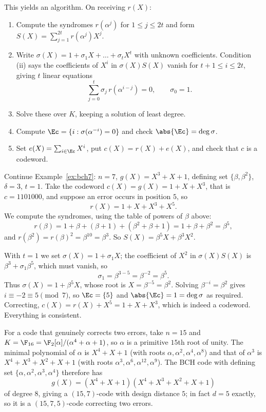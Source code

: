 This yields an algorithm. On receiving $r(X)$:
\begin{enumerate}[label=(\arabic*)]
	\item Compute the syndromes $r(\alpha^j)$ for $1 \le j \le 2t$ and form $S(X) = \sum_{j=1}^{2t}r(\alpha^j)X^j$.
	\item Write $\sigma(X) = 1 + \sigma_1X+\dots+\sigma_tX^t$ with unknown coefficients. Condition (ii) says the coefficients of $X^i$ in $\sigma(X)S(X)$ vanish for $t+1\le i\le 2t$, giving $t$ linear equations
	$$\sum_{j=0}^{t}\sigma_j\, r(\alpha^{i-j}) = 0, \qquad \sigma_0 = 1.$$
	\item Solve these over $K$, keeping a solution of least degree.
	\item Compute $\Ec = \{i : \sigma(\alpha^{-i}) = 0\}$ and check $\abs{\Ec} = \deg\sigma$.
	\item Set $e(X) = \sum_{i\in\Ec}X^i$, put $c(X) = r(X)+e(X)$, and check that $c$ is a codeword.
\end{enumerate}

\begin{example}
	Continue Example~\ref{ex:bch7}: $n = 7$, $g(X)=X^3+X+1$, defining set $\{\beta,\beta^2\}$, $\delta = 3$, $t = 1$. Take the codeword $c(X) = g(X) = 1+X+X^3$, that is $c = 1101000$, and suppose an error occurs in position $5$, so
	$$r(X) = 1+X+X^3+X^5.$$
	We compute the syndromes, using the table of powers of $\beta$ above:
	$$r(\beta) = 1+\beta+(\beta+1)+(\beta^2+\beta+1) = 1 + \beta+\beta^2 = \beta^5,$$
	and $r(\beta^2) = r(\beta)^2 = \beta^{10} = \beta^3$. So $S(X) = \beta^5X+\beta^3X^2$.

	With $t=1$ we set $\sigma(X) = 1+\sigma_1X$; the coefficient of $X^2$ in $\sigma(X)S(X)$ is $\beta^3 + \sigma_1\beta^5$, which must vanish, so
	$$\sigma_1 = \beta^{3-5} = \beta^{-2}=\beta^5.$$
	Thus $\sigma(X) = 1+\beta^5X$, whose root is $X = \beta^{-5} = \beta^2$. Solving $\beta^{-i} = \beta^2$ gives $i \equiv -2\equiv 5 \pmod 7$, so $\Ec = \{5\}$ and $\abs{\Ec}=1=\deg\sigma$ as required. Correcting, $c(X) = r(X)+X^5 = 1+X+X^3$, which is indeed a codeword. Everything is consistent.
\end{example}

\begin{example}
	For a code that genuinely corrects two errors, take $n = 15$ and $K = \F_{16} = \F_2[\alpha]/(\alpha^4+\alpha+1)$, so $\alpha$ is a primitive $15$th root of unity. The minimal polynomial of $\alpha$ is $X^4+X+1$ (with roots $\alpha,\alpha^2,\alpha^4,\alpha^8$) and that of $\alpha^3$ is $X^4+X^3+X^2+X+1$ (with roots $\alpha^3,\alpha^6,\alpha^{12},\alpha^9$). The BCH code with defining set $\{\alpha,\alpha^2,\alpha^3,\alpha^4\}$ therefore has
	$$g(X) = (X^4+X+1)(X^4+X^3+X^2+X+1)$$
	of degree $8$, giving a $(15,7)$-code with design distance $5$; in fact $d = 5$ exactly, so it is a $(15,7,5)$-code correcting two errors.
\end{example}

